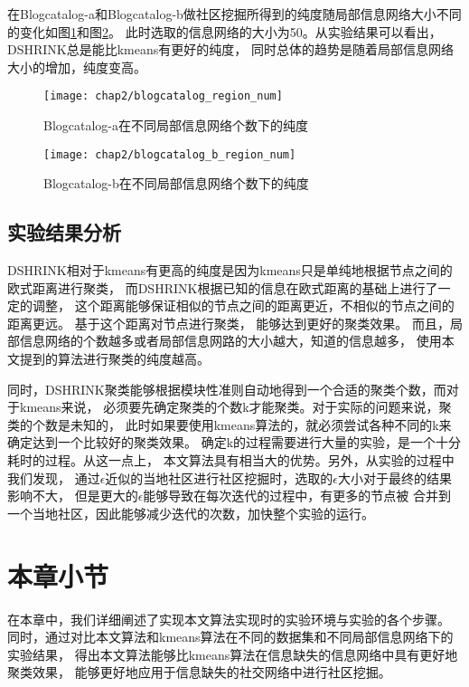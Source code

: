 在Blogcatalog-a和Blogcatalog-b做社区挖掘所得到的纯度随局部信息网络大小不同的变化如图\ref{fig:region_num:a}和图\ref{fig:region_num:b}。
此时选取的信息网络的大小为50。从实验结果可以看出，DSHRINK总是能比kmeans有更好的纯度，
同时总体的趋势是随着局部信息网络大小的增加，纯度变高。

\begin{figure}
    \texttt{[image: chap2/blogcatalog\_region\_num]}
    \caption{Blogcatalog-a在不同局部信息网络个数下的纯度}
    \label{fig:region_num:a}
\end{figure}

\begin{figure}
    \texttt{[image: chap2/blogcatalog\_b\_region\_num]}
    \caption{Blogcatalog-b在不同局部信息网络个数下的纯度}
    \label{fig:region_num:b}
\end{figure}

\subsection{实验结果分析}

DSHRINK相对于kmeans有更高的纯度是因为kmeans只是单纯地根据节点之间的欧式距离进行聚类，
而DSHRINK根据已知的信息在欧式距离的基础上进行了一定的调整，
这个距离能够保证相似的节点之间的距离更近，不相似的节点之间的距离更远。
基于这个距离对节点进行聚类，
能够达到更好的聚类效果。
而且，局部信息网络的个数越多或者局部信息网路的大小越大，知道的信息越多，
使用本文提到的算法进行聚类的纯度越高。

同时，DSHRINK聚类能够根据模块性准则自动地得到一个合适的聚类个数，而对于kmeans来说，
必须要先确定聚类的个数k才能聚类。对于实际的问题来说，聚类的个数是未知的，
此时如果要使用kmeans算法的，就必须尝试各种不同的k来确定达到一个比较好的聚类效果。
确定k的过程需要进行大量的实验，是一个十分耗时的过程。从这一点上，
本文算法具有相当大的优势。另外，从实验的过程中我们发现，
通过$\epsilon$近似的当地社区进行社区挖掘时，选取的$\epsilon$大小对于最终的结果影响不大，
但是更大的$\epsilon$能够导致在每次迭代的过程中，有更多的节点被
合并到一个当地社区，因此能够减少迭代的次数，加快整个实验的运行。

\section{本章小节}

在本章中，我们详细阐述了实现本文算法实现时的实验环境与实验的各个步骤。
同时，通过对比本文算法和kmeans算法在不同的数据集和不同局部信息网络下的实验结果，
得出本文算法能够比kmeans算法在信息缺失的信息网络中具有更好地聚类效果，
能够更好地应用于信息缺失的社交网络中进行社区挖掘。
